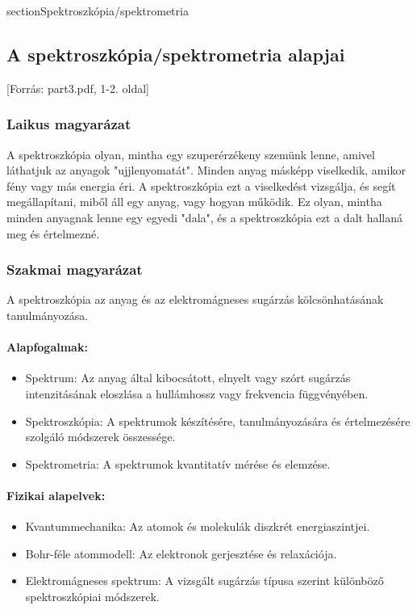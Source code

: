 \documentclass[a4paper,12pt]{article}
\begin{document}
\newpage

section{Spektroszkópia/spektrometria}

\subsection{A spektroszkópia/spektrometria alapjai} [Forrás: part3.pdf, 1-2. oldal]

\subsubsection{Laikus magyarázat} A spektroszkópia olyan, mintha egy szuperérzékeny szemünk lenne, amivel láthatjuk az anyagok "ujjlenyomatát". Minden anyag másképp viselkedik, amikor fény vagy más energia éri. A spektroszkópia ezt a viselkedést vizsgálja, és segít megállapítani, miből áll egy anyag, vagy hogyan működik. Ez olyan, mintha minden anyagnak lenne egy egyedi "dala", és a spektroszkópia ezt a dalt hallaná meg és értelmezné.

\subsubsection{Szakmai magyarázat} A spektroszkópia az anyag és az elektromágneses sugárzás kölcsönhatásának tanulmányozása.

\paragraph{Alapfogalmak:} \begin{itemize} \item Spektrum: Az anyag által kibocsátott, elnyelt vagy szórt sugárzás intenzitásának eloszlása a hullámhossz vagy frekvencia függvényében. \item Spektroszkópia: A spektrumok készítésére, tanulmányozására és értelmezésére szolgáló módszerek összessége. \item Spektrometria: A spektrumok kvantitatív mérése és elemzése. \end{itemize}

\paragraph{Fizikai alapelvek:} \begin{itemize} \item Kvantummechanika: Az atomok és molekulák diszkrét energiaszintjei. \item Bohr-féle atommodell: Az elektronok gerjesztése és relaxációja. \item Elektromágneses spektrum: A vizsgált sugárzás típusa szerint különböző spektroszkópiai módszerek. \end{itemize}
\end{document}
